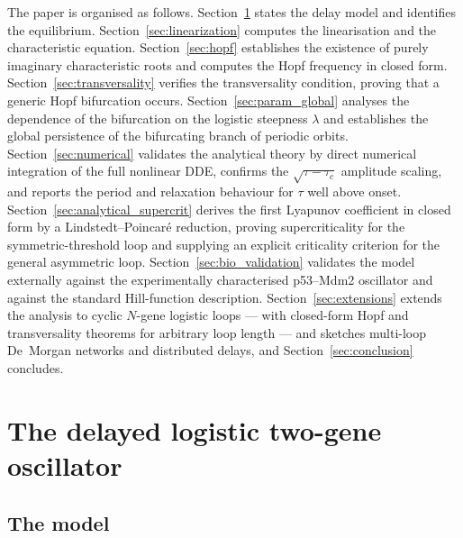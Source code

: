 \documentclass[sn-mathphys,Numbered]{sn-jnl}
\theoremstyle{thmstyleone}
\theoremstyle{thmstyletwo}
\theoremstyle{thmstylethree}
\begin{document}
The paper is organised as follows.
Section~\ref{sec:formulation} states the delay model and identifies the
equilibrium.
Section~\ref{sec:linearization} computes the linearisation and the
characteristic equation.
Section~\ref{sec:hopf} establishes the existence of purely imaginary
characteristic roots and computes the Hopf frequency in closed form.
Section~\ref{sec:transversality} verifies the transversality condition,
proving that a generic Hopf bifurcation occurs.
Section~\ref{sec:param_global} analyses the dependence of the
bifurcation on the logistic steepness $\lambda$ and establishes the
global persistence of the bifurcating branch of periodic orbits.
Section~\ref{sec:numerical} validates the analytical theory by direct
numerical integration of the full nonlinear DDE, confirms the
$\sqrt{\tau-\tau_c}$ amplitude scaling, and reports the period and
relaxation behaviour for $\tau$ well above onset.
Section~\ref{sec:analytical_supercrit} derives the first Lyapunov
coefficient in closed form by a Lindstedt--Poincar\'e reduction, proving
supercriticality for the symmetric-threshold loop and supplying an
explicit criticality criterion for the general asymmetric loop.
Section~\ref{sec:bio_validation} validates the model externally against
the experimentally characterised p53--Mdm2 oscillator and against the
standard Hill-function description.
Section~\ref{sec:extensions} extends the analysis to cyclic $N$-gene
logistic loops --- with closed-form Hopf and transversality theorems for
arbitrary loop length --- and sketches multi-loop De~Morgan networks and
distributed delays, and Section~\ref{sec:conclusion} concludes.

\section{The delayed logistic two-gene oscillator}
\label{sec:formulation}

\subsection{The model}
\end{document}
